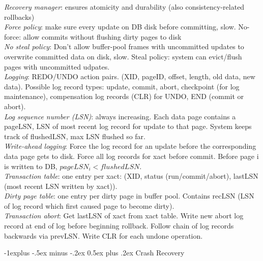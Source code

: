 \documentclass[10pt,landscape]{article}
\makeatletter
\renewcommand{\subsection}{\@startsection{subsection}{2}{0mm}%
                                {-1explus -.5ex minus -.2ex}%
                                {0.5ex plus .2ex}%
                                {\normalfont\normalsize\bfseries}}
\makeatother
\begin{document}
\begin{multicols}{3}
\textit{Recovery manager}: ensures atomicity and durability (also consistency-related rollbacks) \\
\textit{Force policy}: make sure every update on DB disk before committing, slow. No-force: allow commits without flushing dirty pages to disk \\
\textit{No steal policy}: Don't allow buffer-pool frames with uncommitted updates to overwrite committed data on disk, slow. Steal policy: system can evict/flush pages with uncommitted udpates. \\
\textit{Logging}: REDO/UNDO action pairs. (XID, pageID, offset, length, old data, new data). Possible log record types: update, commit, abort, checkpoint (for log maintenance), compensation log records (CLR) for UNDO, END (commit or abort). \\
\textit{Log sequence number (LSN)}: always increasing. Each data page contains a pageLSN, LSN of most recent log record for update to that page. System keeps track of flushedLSN, max LSN flushed so far. \\
\textit{Write-ahead logging}: Force the log record for an update before the corresponding data page gets to disk. Force all log records for xact before commit. Before page i is written to DB, $pageLSN_i < flushedLSN$. \\
\textit{Transaction table}: one entry per xact: (XID, status (run/commit/abort), lastLSN (most recent LSN written by xact)). \\
\textit{Dirty page table}: one entry per dirty page in buffer pool. Contains recLSN (LSN of log record which first caused page to become dirty). \\
\textit{Transaction abort}: Get lastLSN of xact from xact table. Write new abort log record at end of log before beginning rollback. Follow chain of log records backwards via prevLSN. Write CLR for each undone operation.

\subsection{Crash Recovery}


\end{multicols}
\end{document}
